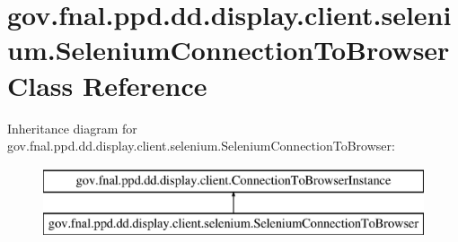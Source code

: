 \hypertarget{classgov_1_1fnal_1_1ppd_1_1dd_1_1display_1_1client_1_1selenium_1_1SeleniumConnectionToBrowser}{\section{gov.\-fnal.\-ppd.\-dd.\-display.\-client.\-selenium.\-Selenium\-Connection\-To\-Browser Class Reference}
\label{classgov_1_1fnal_1_1ppd_1_1dd_1_1display_1_1client_1_1selenium_1_1SeleniumConnectionToBrowser}
}
Inheritance diagram for gov.\-fnal.\-ppd.\-dd.\-display.\-client.\-selenium.\-Selenium\-Connection\-To\-Browser\-:\begin{figure}[H]
\begin{center}
\leavevmode
\includegraphics[height=2.000000cm]{classgov_1_1fnal_1_1ppd_1_1dd_1_1display_1_1client_1_1selenium_1_1SeleniumConnectionToBrowser}
\end{center}
\end{figure}
